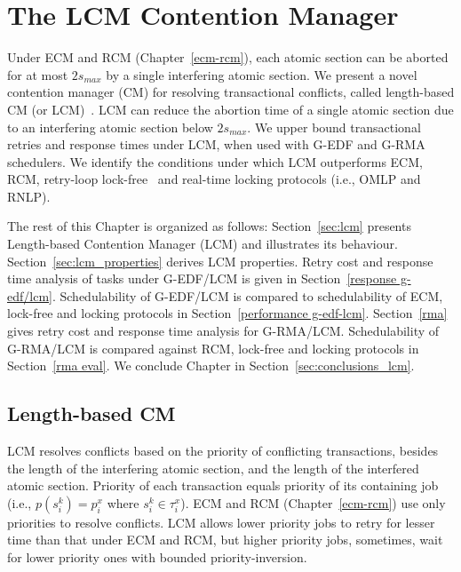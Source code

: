 \chapter{\label{ch_lcm}The LCM Contention Manager}
%
Under ECM and RCM (Chapter~\ref{ecm-rcm}), each atomic section can be aborted for at most $2s_{max}$ by a single interfering atomic section. We present a novel contention manager (CM) for resolving transactional conflicts, called length-based CM (or LCM)~\cite{lcmdac2012}. LCM can reduce the abortion time of a single atomic section due to an interfering atomic section below $2s_{max}$. We upper bound transactional retries and response times under LCM, when used with G-EDF and G-RMA schedulers. We identify the conditions under which LCM outperforms ECM, RCM, retry-loop lock-free~\cite{key-5} and real-time locking protocols (i.e., OMLP\cite{springerlink:10.1007/s10617-012-9090-1,key-3} and RNLP\cite{6257574}).

The rest of this Chapter is organized as follows: Section~\ref{sec:lcm} presents Length-based Contention Manager (LCM) and illustrates its behaviour. Section~\ref{sec:lcm_properties} derives LCM properties. Retry cost and response time analysis of tasks under G-EDF/LCM is given in Section~\ref{response g-edf/lcm}. Schedulability of G-EDF/LCM is compared to schedulability of ECM, lock-free and locking protocols in Section~\ref{performance g-edf-lcm}. Section~\ref{rma} gives retry cost and response time analysis for G-RMA/LCM. Schedulability of G-RMA/LCM is compared against RCM, lock-free and locking protocols in Section~\ref{rma eval}. We conclude Chapter in Section~\ref{sec:conclusions_lcm}.
%
\section{\label{sec:lcm}Length-based CM}
%
LCM resolves conflicts based on the priority of conflicting transactions, besides the length of the interfering atomic section, and the length of the interfered atomic section. Priority of each transaction equals priority of its containing job (i.e., $p\left(s_i^k\right)=p_i^x$ where $s_i^k \in \tau_i^x$). ECM and RCM (Chapter~\ref{ecm-rcm}) use only priorities to resolve conflicts. LCM allows lower priority jobs to retry for lesser time than that under ECM and RCM, but higher priority jobs, sometimes, wait for lower priority ones with bounded priority-inversion.

